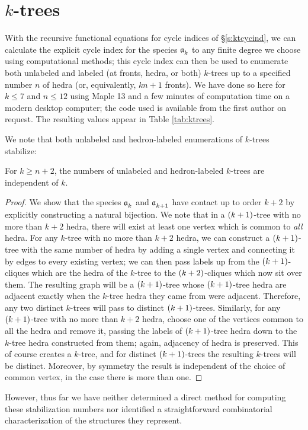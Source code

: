\documentclass[distribution,draft]{brandiss} %
\numberwithin{section}{chapter}
\numberwithin{figure}{chapter}
\begin{document}
\section{$k$-trees}\label{s:ktenum}
With the recursive functional equations for cycle indices of \S \ref{s:ktcycind}, we can calculate the explicit cycle index for the species $\mathfrak{a}_{k}^{}$ to any finite degree we choose using computational methods; this cycle index can then be used to enumerate both unlabeled and labeled (at fronts, hedra, or both) $k$-trees up to a specified number $n$ of hedra (or, equivalently, $kn + 1$ fronts).
We have done so here for $k \leq 7$ and $n \leq 12$ using Maple 13 and a few minutes of computation time on a modern desktop computer; the code used is available from the first author on request.
The resulting values appear in Table \ref{tab:ktrees}.

We note that both unlabeled and hedron-labeled enumerations of $k$-trees stabilize:
\begin{theorem}
  \label{thm:ktreestab}
  For $k \geq n + 2$, the numbers of unlabeled and hedron-labeled $k$-trees are independent of $k$.
\end{theorem}
\begin{proof}
  We show that the species $\mathfrak{a}_{k}^{}$ and $\mathfrak{a}_{k+1}^{}$ have contact up to order $k+2$ by explicitly constructing a natural bijection.
  We note that in a $\left( {k+1} \right)$-tree with no more than $k+2$ hedra, there will exist at least one vertex which is common to \emph{all} hedra.
  For any $k$-tree with no more than $k+2$ hedra, we can construct a $\left( {k+1} \right)$-tree with the same number of hedra by adding a single vertex and connecting it by edges to every existing vertex; we can then pass labels up from the $\left( {k+1} \right)$-cliques which are the hedra of the $k$-tree to the $\left( {k+2} \right)$-cliques which now sit over them.
  The resulting graph will be a $\left( {k+1} \right)$-tree whose $\left( {k+1} \right)$-tree hedra are adjacent exactly when the $k$-tree hedra they came from were adjacent.
  Therefore, any two distinct $k$-trees will pass to distinct $\left( {k+1} \right)$-trees.
  Similarly, for any $\left( {k+1} \right)$-tree with no more than $k+2$ hedra, choose one of the vertices common to all the hedra and remove it, passing the labels of $\left( {k+1} \right)$-tree hedra down to the $k$-tree hedra constructed from them; again, adjacency of hedra is preserved.
  This of course creates a $k$-tree, and for distinct $\left( {k+1} \right)$-trees the resulting $k$-trees will be distinct.
  Moreover, by symmetry the result is independent of the choice of common vertex, in the case there is more than one.
\end{proof}
However, thus far we have neither determined a direct method for computing these stabilization numbers nor identified a straightforward combinatorial characterization of the structures they represent.
\end{document}
